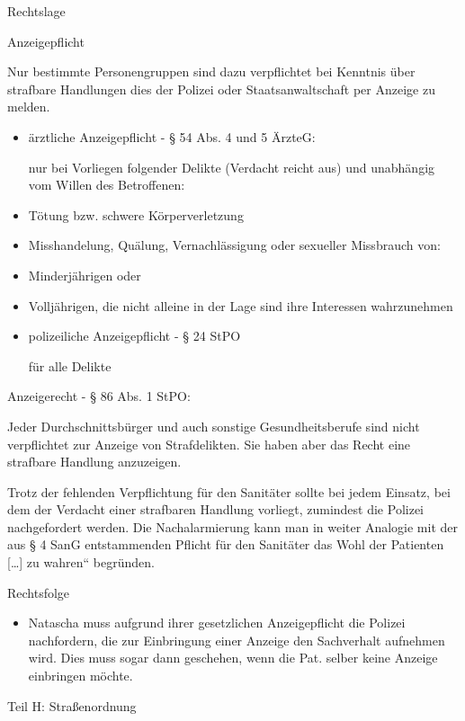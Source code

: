 \documentclass{article}
\begin{document}
Rechtslage

Anzeigepflicht

Nur bestimmte Personengruppen sind dazu verpflichtet bei Kenntnis \"uber
strafbare Handlungen dies der Polizei oder Staatsanwaltschaft per
Anzeige zu melden.

\begin{itemize}
\item \"arztliche Anzeigepflicht - {\S} 54 Abs. 4 und 5 \"ArzteG:

nur bei Vorliegen folgender Delikte (Verdacht reicht aus) und
unabh\"angig vom Willen des Betroffenen:

\end{itemize}
\begin{itemize}
\item T\"otung bzw. schwere K\"orperverletzung

\item  Misshandelung, Qu\"alung, Vernachl\"assigung oder sexueller
Missbrauch von:

\end{itemize}
\begin{itemize}
\item Minderj\"ahrigen oder

\item Vollj\"ahrigen, die nicht alleine in der Lage sind ihre Interessen
wahrzunehmen

\end{itemize}
\begin{itemize}
\item polizeiliche Anzeigepflicht - {\S} 24 StPO

f\"ur alle Delikte

\end{itemize}
Anzeigerecht - {\S} 86 Abs. 1 StPO:

Jeder Durchschnittsb\"urger und auch sonstige Gesundheitsberufe sind
nicht verpflichtet zur Anzeige von Strafdelikten. Sie haben aber das
Recht eine strafbare Handlung anzuzeigen. 

Trotz der fehlenden Verpflichtung f\"ur den Sanit\"ater sollte bei jedem
Einsatz, bei dem der Verdacht einer strafbaren Handlung vorliegt,
zumindest die Polizei nachgefordert werden. Die Nachalarmierung kann
man in weiter Analogie mit der aus {\S} 4 SanG entstammenden Pflicht
f\"ur den Sanit\"ater {\quotedblbase}das Wohl der Patienten [{\dots}]
zu wahren{\textquotedblleft} begr\"unden.

Rechtsfolge

\begin{itemize}
\item Natascha muss aufgrund ihrer gesetzlichen Anzeigepflicht die
Polizei nachfordern, die zur Einbringung einer Anzeige den Sachverhalt
aufnehmen wird. Dies muss sogar dann geschehen, wenn die Pat. selber
keine Anzeige einbringen m\"ochte.

\end{itemize}
Teil H: Stra{\ss}enordnung
\end{document}
